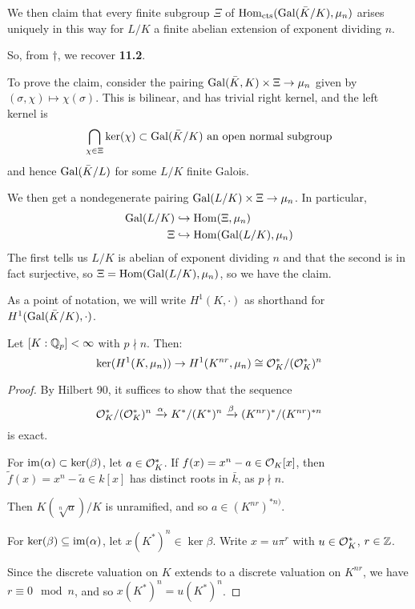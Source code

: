 \documentclass[10pt,a4paper]{article}
\begin{document}
We then claim that every finite subgroup $\Xi$ of $\operatorname{Hom}_{\text{cts}}(\operatorname{Gal}(\bar{K}/K), \mu_n)$ arises uniquely in this way for $L/K$ a finite abelian extension of exponent dividing $n$.

So, from $\dagger$, we recover \textbf{11.2}.

To prove the claim, consider the pairing $\operatorname{Gal}(\bar{K},K)\times \Xi \to \mu_n$ given by $(\sigma, \chi) \mapsto \chi(\sigma)$. This is bilinear, and has trivial right kernel, and the left kernel is
\[\bigcap_{\chi \in \Xi} \ker(\chi)\subset \operatorname{Gal}(\bar{K}/K)\text{ an open normal subgroup}\]
and hence $\operatorname{Gal}(\bar{K}/L)$ for some $L/K$ finite Galois.

We then get a nondegenerate pairing $\operatorname{Gal}(L/K) \times \Xi \to \mu_n$. In particular,
\begin{align*}
  \operatorname{Gal}(L/K) &\hookrightarrow \operatorname{Hom}(\Xi, \mu_n)\\
  \Xi &\hookrightarrow \operatorname{Hom}(\operatorname{Gal}(L/K), \mu_n)
\end{align*}
The first tells us $L/K$ is abelian of exponent dividing $n$ and that the second is in fact surjective, so $\Xi = \operatorname{Hom}(\operatorname{Gal}(L/K), \mu_n)$, so we have the claim.

As a point of notation, we will write $H^1(K, \cdot)$ as shorthand for $H^1(\operatorname{Gal}(\bar{K}/K), \cdot)$.
\begin{lemma}
  Let $[K:\mathbb{Q}_p]<\infty$ with $p \nmid n$. Then:
  \[\ker(H^1(K,\mu_n)) \to H^1(K^{nr}, \mu_n) \cong \mathcal{O}_K^\ast/(\mathcal{O}_K^\ast)^n\]
\end{lemma}
\begin{proof}
  By Hilbert 90, it suffices to show that the sequence
  \[\mathcal{O}_K^\ast/(\mathcal{O}_K^\ast)^n \xrightarrow{\alpha} K^\ast/(K^\ast)^n \xrightarrow{\beta} (K^{nr})^\ast/(K^{nr})^{\ast n}\]
  is exact.

  For $\operatorname{im}(\alpha) \subset \ker(\beta)$, let $a \in \mathcal{O}_K^\ast$. If $f(x) = x^n-a \in \mathcal{O}_K[x]$, then $\tilde{f}(x) = x^n-\tilde{a} \in k[x]$ has distinct roots in $\bar{k}$, as $p \nmid n$.

  Then $K(\sqrt[n]{a})/K$ is unramified, and so $a \in (K^{nr})^{\ast n)}$.

  For $\ker(\beta) \subseteq \operatorname{im}(\alpha)$, let $x(K^\ast)^n \in \ker \beta$. Write $x = u\pi^r$ with $u \in \mathcal{O}_K^\ast$, $r \in \mathbb{Z}$.

  Since the discrete valuation on $K$ extends to a discrete valuation on $K^{nr}$, we have $r \equiv 0 \mod n$, and so $x(K^\ast)^n = u(K^\ast)^n$.
\end{proof}
\end{document}
